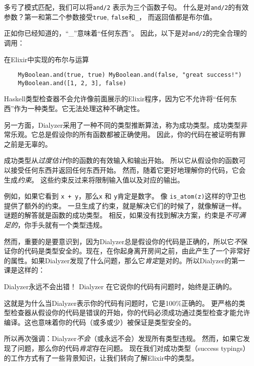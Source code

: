 多亏了模式匹配，我们可以将\texttt{and/2} 表示为三个函数子句。
什么是对\texttt{and/2}的有效参数？第一和第二个参数接受\texttt{true}, \texttt{false}和\texttt{\_}， 而返回值都是布尔值。

正如你已经知道的，``\_''意味着``任何东西''。
因此，以下是对\texttt{and/2}的完全合理的调用：

\begin{code}{在Elixir中实现的布尔与运算}
  \begin{verbatim} 
    MyBoolean.and(true, true) MyBoolean.and(false, "great success!")
    MyBoolean.and([1, 2, 3], false)
  \end{verbatim}
\end{code}

Haskell类型检查器不会允许像前面展示的Elixir程序，因为它不允许将``任何东西''作为一种类型。它无法处理这种不确定性。

另一方面，Dialyzer采用了一种不同的类型推断算法，称为成功类型。成功类型非常乐观。它总是假设你的所有函数都被正确使用。
因此，你的代码在被证明有罪之前是无辜的。

成功类型从\emph{过度估计}你的函数的有效输入和输出开始。
所以它从假设你的函数可以接受任何东西并返回任何东西开始。
然而，随着它更好地理解你的代码，它会生成\emph{约束}。
这些约束反过来将限制输入值以及对应的输出。

例如，如果它看到 \texttt{x + y}，那么\texttt{x} 和 \texttt{y}肯定是数字。
像 \texttt{is\_atom(z)}这样的守卫也提供了额外的约束。
一旦生成了约束，就是解决它们的时候了，就像解谜一样。
谜题的解答就是函数的成功类型。
相反，如果没有找到解决方案，约束是\emph{不可满足的}，你手头就有一个类型违规。

然而，重要的是要意识到，因为Dialyzer总是假设你的代码是正确的，所以它\emph{不}保证你的代码是类型安全的。现在，在你起身离开房间之前，由此产生了一个非常好的属性。如果Dialyzer发现了什么问题，那么它\emph{肯定}是对的。所以Dialyzer的第一课是这样的：

\begin{note}{Dialyzer永远不会出错！}
Dialyzer 在它说你的代码有问题时，始终是正确的。
\end{note}


这就是为什么当Dialyzer表示你的代码有问题时，它是100\%正确的。
更严格的类型检查器从假设你的代码是错误的开始，你的代码必须成功通过类型检查才能允许编译。这也意味着你的代码（或多或少）被保证是类型安全的。

所以再次强调：Dialyzer\emph{不会}（或永远不会）发现所有类型违规。
然而，如果它发现了问题，那么你的代码\emph{肯定}存在问题。
现在我们对成功类型（success typings）的工作方式有了一些背景知识，让我们转向了解Elixir中的类型。

